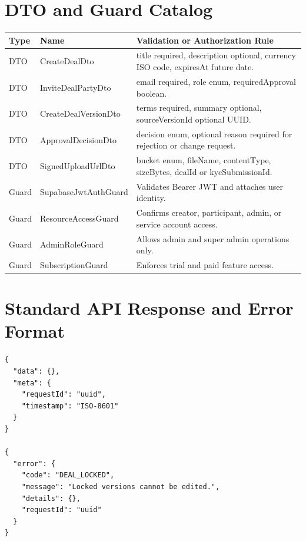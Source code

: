 \section{DTO and Guard Catalog}
\begin{longtable}{p{}p{}p{}}
\toprule
Type & Name & Validation or Authorization Rule \\
\midrule
DTO & CreateDealDto & title required, description optional, currency ISO code, expiresAt future date. \\
DTO & InviteDealPartyDto & email required, role enum, requiredApproval boolean. \\
DTO & CreateDealVersionDto & terms required, summary optional, sourceVersionId optional UUID. \\
DTO & ApprovalDecisionDto & decision enum, optional reason required for rejection or change request. \\
DTO & SignedUploadUrlDto & bucket enum, fileName, contentType, sizeBytes, dealId or kycSubmissionId. \\
Guard & SupabaseJwtAuthGuard & Validates Bearer JWT and attaches user identity. \\
Guard & ResourceAccessGuard & Confirms creator, participant, admin, or service account access. \\
Guard & AdminRoleGuard & Allows admin and super admin operations only. \\
Guard & SubscriptionGuard & Enforces trial and paid feature access. \\
\bottomrule
\end{longtable}

\section{Standard API Response and Error Format}
\begin{lstlisting}
{
  "data": {},
  "meta": {
    "requestId": "uuid",
    "timestamp": "ISO-8601"
  }
}

{
  "error": {
    "code": "DEAL_LOCKED",
    "message": "Locked versions cannot be edited.",
    "details": {},
    "requestId": "uuid"
  }
}
\end{lstlisting}

